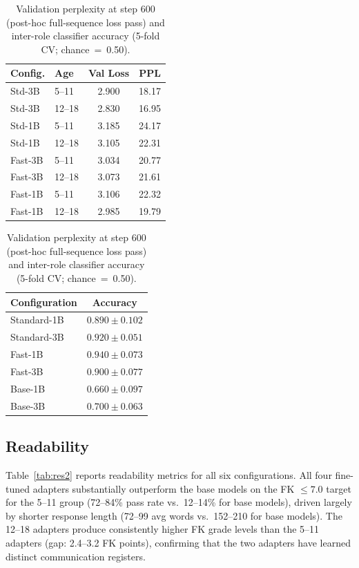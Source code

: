 \documentclass[ASNA,twocolumn]{USG} %
\begin{document}
\begin{table}[!t]
  \centering
  \caption{Validation perplexity at step 600 (post-hoc full-sequence loss pass) and inter-role classifier accuracy (5-fold CV; chance~=~0.50).}
  \label{tab:res1}
  \footnotesize
  \begin{minipage}[t]{0.5\linewidth}
    \centering
    \begin{tabular}{llcc}
      \hline
      Config. & Age & Val Loss & PPL \\
      \hline
      Std-3B & 5--11  & 2.900 & 18.17 \\
      Std-3B & 12--18 & 2.830 & 16.95 \\
      Std-1B & 5--11  & 3.185 & 24.17 \\
      Std-1B & 12--18 & 3.105 & 22.31 \\
      Fast-3B & 5--11  & 3.034 & 20.77 \\
      Fast-3B & 12--18 & 3.073 & 21.61 \\
      Fast-1B & 5--11  & 3.106 & 22.32 \\
      Fast-1B & 12--18 & 2.985 & 19.79 \\
      \hline
    \end{tabular}
  \end{minipage}%
  \begin{minipage}[t]{0.5\linewidth}
    \centering
    \begin{tabular}{lc}
      \hline
      Configuration & Accuracy \\
      \hline
      Standard-1B & $0.890 \pm 0.102$ \\
      Standard-3B & $0.920 \pm 0.051$ \\
      Fast-1B     & $0.940 \pm 0.073$ \\
      Fast-3B     & $0.900 \pm 0.077$ \\
      Base-1B     & $0.660 \pm 0.097$ \\
      Base-3B     & $0.700 \pm 0.063$ \\
      \hline
    \end{tabular}
  \end{minipage}
\end{table}

\subsection{Readability}

Table~\ref{tab:res2} reports readability metrics for all six configurations. All four fine-tuned adapters substantially outperform the base models on the FK $\leq 7.0$ target for the 5--11 group (72--84\% pass rate vs.\ 12--14\% for base models), driven largely by shorter response length (72--99 avg words vs.\ 152--210 for base models). The 12--18 adapters produce consistently higher FK grade levels than the 5--11 adapters (gap: 2.4--3.2 FK points), confirming that the two adapters have learned distinct communication registers.
\end{document}
